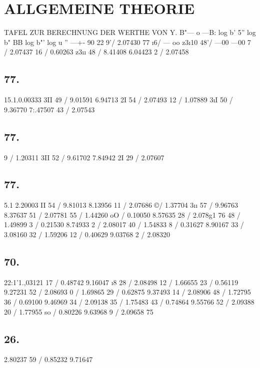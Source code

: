 \documentclass[12pt,a4paper]{article}
\begin{document}
\newpage


\section*{ALLGEMEINE THEORIE}
TAFEL ZUR BERECHNUNG DER WERTHE VON Y. B"--- \textdegree{} o ---B: log b' 5'' log b" BB log b"' log u '' ---+- 90\textdegree{} 22\textdegree{} 9'/ 2.07430 77\textdegree{} \i{}6/ --- oo z3\i{}10 48'/ ---00 ---00 7 /  2.07437 16 / 0.60263 z3\i{}\i{} 48 / 8.41408 6.04423 2 / 2.07458

\subsection*{77.}
15.1.0.00333 3II 49 / 9.01591 6.94713 2I 54 / 2.07493 12 / 1.07889 3\i{}I 50 / 9.36770 7:.47507 43 / 2.07543

\subsection*{77.}
9 / 1.20311 3II 52 / 9.61702 7.84942 2I 29 / 2.07607

\subsection*{77.}
5.1 2.20003 II 54 / 9.81013 8.13956 11 / 2.07686 \copyright{}/ 1.37704 3\i{}\i{} 57 / 9.96763 8.37637 51 / 2.07781 55 / 1.44260 oO / 0.10050 8.57635 28 / 2.078g1 76 48 / 1.49899 3 / 0.21530 8.74933 2 / 2.08017 40 / 1.54833 8 /  0.31627 8.90167 33 / 3.08160 32 / 1.59206 12 / 0.40629 9.03768 2 / 2.08320

\subsection*{70.}
22:1'1.,03121 17 / 0.48742 9.16047 \i{}8 28 / 2.08498 12 / 1.66655 23 / 0.56119 9.27231 52 / 2.08693 0 / 1.69865 29 / 0.62875 9.37493 14 / 2.08906 48 / 1.72795 36 / 0.69100 9.46969 34 / 2.09138 35 / 1.75483 43 / 0.74864 9.55766 52 / 2.09388 20 / 1.77955 so / 0.80226 9.63968 9 /  2.09658 75\textdegree{}

\subsection*{26.}
2.80237 59 / 0.85232 9.71647 %
\end{document}
